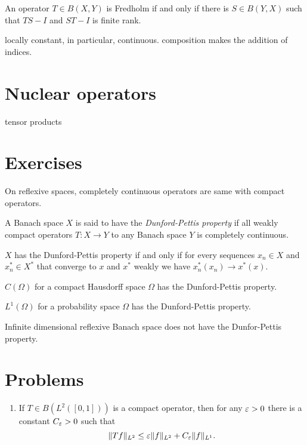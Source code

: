 \documentclass{../../large}
\begin{document}
\begin{prb}
An operator $T\in B(X,Y)$ is Fredholm if and only if there is $S\in B(Y,X)$ such that $TS-I$ and $ST-I$ is finite rank.
\end{prb}

\begin{prb}
locally constant, in particular, continuous.
composition makes the addition of indices.
\end{prb}

\section{Nuclear operators}
tensor products





\section*{Exercises}

\begin{prb}
On reflexive spaces, completely continuous operators are same with compact operators.
\end{prb}


\begin{prb}
A Banach space $X$ is said to have the \emph{Dunford-Pettis property} if all weakly compact operators $T:X\to Y$ to any Banach space $Y$ is completely continuous.
\begin{parts}
\item $X$ has the Dunford-Pettis property if and only if for every sequences $x_n\in X$ and $x^*_n\in X^*$ that converge to $x$ and $x^*$ weakly we have $x^*_n(x_n)\to x^*(x)$.
\item $C(\Omega)$ for a compact Hausdorff space $\Omega$ has the Dunford-Pettis property.
\item $L^1(\Omega)$ for a probability space $\Omega$ has the Dunford-Pettis property.
\item Infinite dimensional reflexive Banach space does not have the Dunfor-Pettis property.
\end{parts}
\end{prb}




\section*{Problems}
\begin{enumerate}
\item If $T\in B(L^2([0,1]))$ is a compact operator, then for any $\varepsilon>0$ there is a constant $C_\varepsilon>0$ such that
\[\|Tf\|_{L^2}\le\varepsilon\|f\|_{L^2}+C_\varepsilon\|f\|_{L^1}.\]
\end{enumerate}
\end{document}
